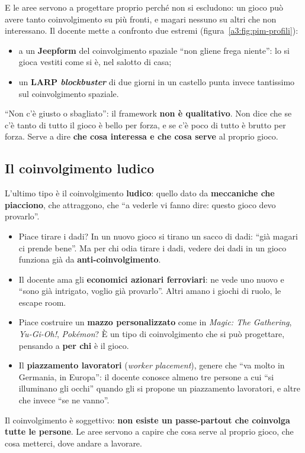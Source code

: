 E le aree servono a progettare proprio perché non si escludono: un gioco può
avere tanto coinvolgimento su più fronti, e magari nessuno su altri che non
interessano. Il docente mette a confronto due estremi
(figura~\ref{a3:fig:pim-profili}):
\begin{itemize}
  \item a un \textbf{Jeepform} del coinvolgimento spaziale ``non gliene frega
        niente'': lo si gioca vestiti come si è, nel salotto di casa;
  \item un \textbf{LARP \emph{blockbuster}} di due giorni in un castello punta
        invece tantissimo sul coinvolgimento spaziale.
\end{itemize}
``Non c'è giusto o sbagliato'': il framework \textbf{non è qualitativo}. Non
dice che se c'è tanto di tutto il gioco è bello per forza, e se c'è poco di tutto
è brutto per forza. Serve a dire \textbf{che cosa interessa e che cosa serve} al
proprio gioco.

\subsection{Il coinvolgimento ludico}



L'ultimo tipo è il coinvolgimento \textbf{ludico}: quello dato da
\textbf{meccaniche che piacciono}, che attraggono, che ``a vederle vi fanno dire:
questo gioco devo provarlo''.
\begin{itemize}
  \item Piace tirare i dadi? In un nuovo gioco si tirano un sacco di dadi: ``già
        magari ci prende bene''. Ma per chi odia tirare i dadi, vedere dei dadi
        in un gioco funziona già da \textbf{anti-coinvolgimento}.
  \item Il docente ama gli \textbf{economici azionari ferroviari}: ne vede uno
        nuovo e ``sono già intrigato, voglio già provarlo''. Altri amano i giochi
        di ruolo, le escape room.
  \item Piace costruire un \textbf{mazzo personalizzato} come in \emph{Magic: The
        Gathering}, \emph{Yu-Gi-Oh!}, \emph{Pokémon}? È un tipo di
        coinvolgimento che si può progettare, pensando a \textbf{per chi} è il
        gioco.
  \item Il \textbf{piazzamento lavoratori} (\emph{worker placement}), genere che
        ``va molto in Germania, in Europa'': il docente conosce almeno tre
        persone a cui ``si illuminano gli occhi'' quando gli si propone un
        piazzamento lavoratori, e altre che invece ``se ne vanno''.
\end{itemize}
Il coinvolgimento è soggettivo: \textbf{non esiste un passe-partout che coinvolga
tutte le persone}. Le aree servono a capire che cosa serve al proprio gioco, che
cosa metterci, dove andare a lavorare.

